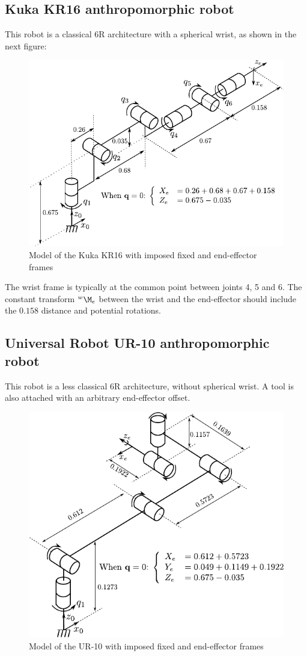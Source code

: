 \documentclass{ecnreport}
\begin{document}
  \subsection{Kuka KR16 anthropomorphic robot}
  
  This robot is a classical 6R architecture with a spherical wrist, as shown in the next figure:
  
  \begin{figure}[h!]\centering
    \includegraphics[width=.6\linewidth]{fig/kr16}
    \caption{Model of the Kuka KR16 with imposed fixed and end-effector frames}
  \end{figure}
  
  The wrist frame is typically at the common point between joints 4, 5 and 6.
  The constant transform $\wMe$ between the wrist and the end-effector should include the $0.158$ distance and potential rotations.
  
  \subsection{Universal Robot UR-10 anthropomorphic robot}
  
  This robot is a less classical 6R architecture, without spherical wrist. A tool is also attached with an arbitrary end-effector offset.
  
  \begin{figure}[h!]\centering
    \includegraphics[width=.6\linewidth]{fig/ur10}
    \caption{Model of the UR-10 with imposed fixed and end-effector frames}
  \end{figure}
  
\end{document}

